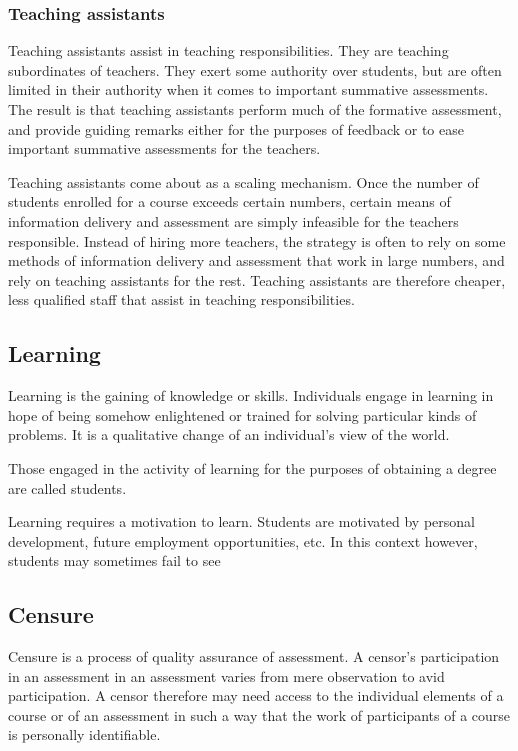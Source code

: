 \subsubsection{Teaching assistants}

Teaching assistants assist in teaching responsibilities. They are teaching
subordinates of teachers. They exert some authority over students, but are
often limited in their authority when it comes to important summative
assessments. The result is that teaching assistants perform much of the
formative assessment, and provide guiding remarks either for the purposes of
feedback or to ease important summative assessments for the teachers.

Teaching assistants come about as a scaling mechanism. Once the number of
students enrolled for a course exceeds certain numbers, certain means of
information delivery and assessment are simply infeasible for the teachers
responsible. Instead of hiring more teachers, the strategy is often to rely on
some methods of information delivery and assessment that work in large numbers,
and rely on teaching assistants for the rest. Teaching assistants are therefore
cheaper, less qualified staff that assist in teaching responsibilities.

\subsection{Learning}

Learning is the gaining of knowledge or skills. Individuals engage in learning
in hope of being somehow enlightened or trained for solving particular kinds of
problems. It is a qualitative change of an individual's view of the
world\cite{ramsden-1992}.

Those engaged in the activity of learning for the purposes of obtaining a
degree are called students.

Learning requires a motivation to learn. Students are motivated by personal development, future employment opportunities, etc. In this context however, students may sometimes fail to see 

\subsection{Censure}

Censure is a process of quality assurance of assessment. A censor's
participation in an assessment in an assessment varies from mere observation to
avid participation. A censor therefore may need access to the individual
elements of a course or of an assessment in such a way that the work of
participants of a course is personally identifiable.

